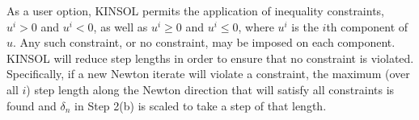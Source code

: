 As a user option, KINSOL permits the application of inequality
constraints, $u^i > 0$ and $u^i < 0$, as well as $u^i \geq 0$ and
$u^i \leq 0$, where $u^i$ is the $i$th component of $u$.  Any such
constraint, or no constraint, may be imposed on each component.
KINSOL will reduce step lengths in order to ensure that no
constraint is violated.  Specifically, if a new Newton iterate
will violate a constraint, the maximum (over all $i$) step length
along the Newton direction that will satisfy all constraints is
found and $\delta_n$ in Step 2(b) is scaled to take a step of that
length.


